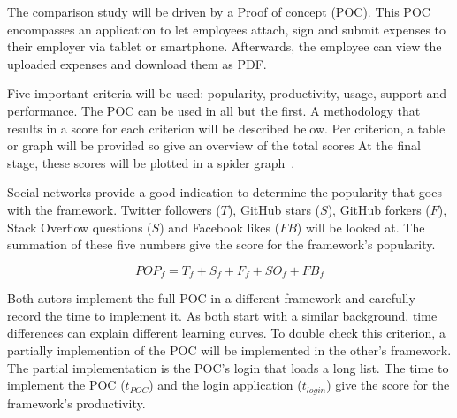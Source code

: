\documentclass[a4paper]{artikel3}
\newcommand{\setspace}[0]{\vspace{2mm}}
\renewcommand{\paragraph}[1]{\setspace \noindent {\bf #1}  }
\begin{document}

The comparison study will be driven by a Proof of concept (POC).  
This POC encompasses an application to let employees attach, sign and submit expenses to their employer via tablet or smartphone.
Afterwards, the employee can view the uploaded expenses and download them as PDF.

Five important criteria will be used:  popularity,  productivity,  usage,  support and performance. 
The POC can be used in all but the first.   
A methodology that results in a score for each criterion will be described below.  
Per criterion,  a table or graph will be provided so give an overview of the total scores
At the final stage,  these scores will be plotted in a spider graph~\cite{Few2005}.   

\paragraph{Popularity}

Social networks provide a good indication to determine the popularity that goes with the framework.  
Twitter followers ($T$),  GitHub stars ($S$),  GitHub forkers ($F$),  Stack Overflow questions ($S$) and Facebook likes ($FB$) will be looked at.
The summation of these five numbers give the score for the framework's popularity.  

\begin{equation}
  POP_f = T_f+S_f+F_f+SO_f+FB_f
  \label{eq:populariteit}
\end{equation}

\paragraph{Productivity}
Both autors implement the full POC in a different framework and carefully record the time to implement it.  
As both start with a similar background,  time differences can explain different learning curves.  
To double check this criterion,  a partially implemention of the POC will be implemented in the other's framework.  
The partial implementation is the POC's login that loads a long list.%
The time to implement the POC ($t_{POC}$) and the login application ($t_{login}$) give the score for the framework's productivity. 
\end{document}
